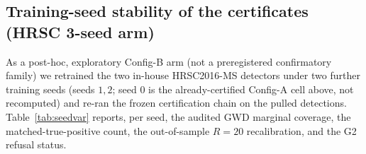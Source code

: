 \documentclass[11pt]{article}
\begin{document}
\subsection{Training-seed stability of the certificates (HRSC 3-seed arm)}\label{sec:seedvar}
As a post-hoc, exploratory Config-B arm (not a preregistered confirmatory family) we retrained the two in-house
HRSC2016-MS detectors under two further training seeds (seeds $1,2$; seed $0$ is the already-certified Config-A
cell above, not recomputed) and re-ran the frozen certification chain on the pulled detections.
Table~\ref{tab:seedvar} reports, per seed, the audited GWD marginal coverage, the matched-true-positive count,
the out-of-sample $R{=}20$ recalibration, and the G2 refusal status.

\begin{table}[t]\centering\small
\caption{HRSC 3-seed arm (post-hoc/exploratory Config-B): per-seed certification quantities at $\alpha=0.10$
(nominal $0.90$), GWD score, same frozen pipeline. Audited marginal coverage (point $[$CI$]$), matched
true-positive count, out-of-sample $R{=}20$ recalibration (mean $[\min,\max]$ over $20$ scene reseeds), and G2
refusal status. Seed $0$ is the already-certified Config-A cell (not recomputed); seeds $1,2$ are added
here.}\label{tab:seedvar}
\end{table}
\end{document}
